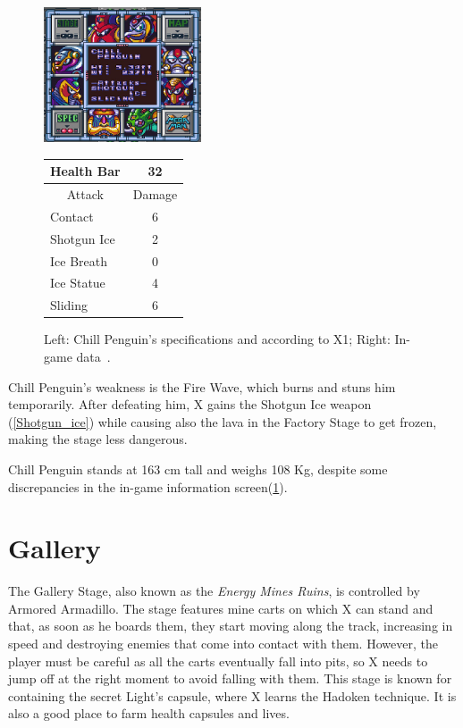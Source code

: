 \begin{figure}[htp]
	\begin{minipage}[c]{0.45\linewidth}
		\vspace{0pt}
		\centering
		\includegraphics[height=4cm]{figures/X1/Chill_penguin/Chill_penguin_specs.jpg}
	\end{minipage}
	\begin{minipage}[c]{0.45\linewidth}
		\centering
		\vspace{0pt}
		\begin{tabular}[h]{l c}
			\toprule
			Health Bar & 32\\
			\midrule
			\multicolumn{1}{c}{Attack} & \multicolumn{1}{c}{Damage}\\
			Contact & 6\\
			Shotgun Ice & 2\\
			Ice Breath & 0\\
			Ice Statue & 4\\
			Sliding & 6\\
			\bottomrule
		\end{tabular}
	\end{minipage}
	\caption{Left: Chill Penguin's specifications and according to X1; Right: In-game data~\cite{wiki:Chill_Penguin,book:Compendium}. }
	\label{Penguin_specs}
\end{figure}

Chill Penguin's weakness is the Fire Wave, which burns and stuns him temporarily. After defeating him, X gains the Shotgun Ice weapon (\ref{Shotgun_ice}) while causing also  the lava in the Factory Stage to get frozen, making the stage less dangerous.

Chill Penguin stands at 163 cm tall and weighs 108 Kg, despite some discrepancies in the in-game information screen(\ref{Penguin_specs}).


\section{Gallery}
The Gallery Stage, also known as the \textit{Energy Mines Ruins}, is controlled by Armored Armadillo. The stage features mine carts on which X can stand and that, as soon as he boards them, they start moving along the track, increasing in speed and destroying enemies that come into contact with them. However, the player must be careful as all the carts eventually fall into pits, so X needs to jump off at the right moment to avoid falling with them. This stage is known for containing the secret Light's capsule, where X learns the Hadoken technique. It is also a good place to farm health capsules and lives.

